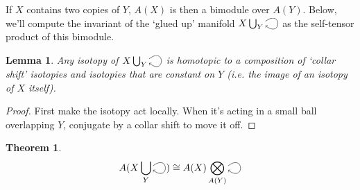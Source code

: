 \documentclass[11pt]{amsart}
\theoremstyle{plain}
\newtheorem{thm}[prop]{Theorem}
\newtheorem{lem}[prop]{Lemma}
\newcommand{\selfarrow}{\ensuremath{\smash{\tikz[baseline]{\clip (0,0.36) rectangle (0.48,-0.16); \draw[->] (0,0.175) .. controls (0.6,0.65) and (0.6,-0.45) .. (0,0.025);}}}}
\newcommand{\iso}{\cong}
\newcommand{\Tensor}{\bigotimes}
\begin{document}
If $X$ contains two copies of $Y$, $A(X)$ is then a bimodule over $A(Y)$. Below, we'll compute the invariant of the `glued up' manifold $X \bigcup_Y \selfarrow$ as the self-tensor product of this bimodule.

\begin{lem}
Any isotopy of $X \bigcup_Y \selfarrow$ is homotopic to a composition of `collar shift' isotopies and isotopies that are constant on $Y$ (i.e. the image of an isotopy of $X$ itself).
\end{lem}
\begin{proof}
First make the isotopy act locally. When it's acting in a small ball overlapping $Y$, conjugate by a collar shift to move it off.
\end{proof}

\begin{thm}
$$A(X \bigcup_Y \selfarrow) \iso A(X) \Tensor_{A(Y)} \selfarrow$$
\end{thm}
\end{document}

